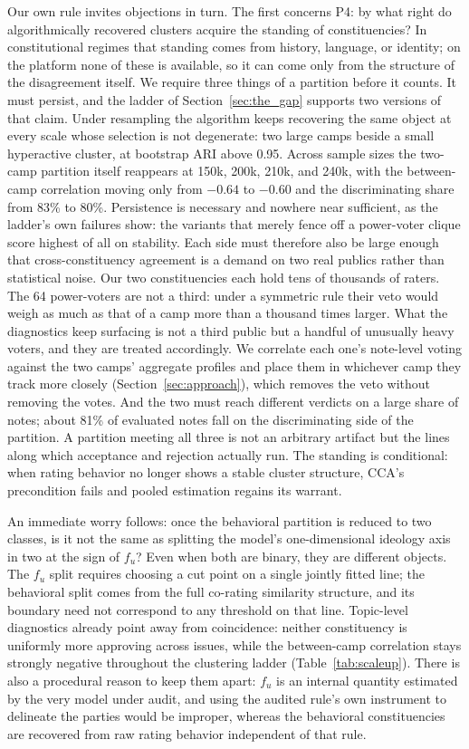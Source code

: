 \documentclass[10pt,twocolumn]{article}
\begin{document}
Our own rule invites objections in turn. The first concerns P4: by what right do
algorithmically recovered clusters acquire the standing of constituencies? In
constitutional regimes that standing comes from history, language, or identity; on
the platform none of these is available, so it can come only from the structure of
the disagreement itself. We require three things of a partition before it counts.
It must persist, and the ladder of Section~\ref{sec:the_gap} supports two versions
of that claim. Under resampling the algorithm keeps recovering the same object at
every scale whose selection is not degenerate: two large camps beside a small
hyperactive cluster, at bootstrap ARI above 0.95. Across sample sizes the two-camp
partition itself reappears at 150k, 200k, 210k, and 240k, with the between-camp
correlation moving only from $-0.64$ to $-0.60$ and the discriminating share from
83\% to 80\%. Persistence is necessary and nowhere near sufficient, as the
ladder's own failures show: the variants that merely fence off a power-voter clique
score highest of all on stability. Each side must therefore also be large enough
that cross-constituency agreement is a demand on two real publics rather than
statistical noise. Our two constituencies each hold tens of thousands of raters.
The 64 power-voters are not a third: under a symmetric rule their veto would weigh
as much as that of a camp more than a thousand times larger. What the diagnostics
keep surfacing is not a third public but a handful of unusually heavy voters, and
they are treated accordingly. We correlate each one's note-level voting against the
two camps' aggregate profiles and place them in whichever camp they track more
closely (Section~\ref{sec:approach}), which removes the veto without removing the
votes. And the two must reach different verdicts on a large share of notes; about
81\% of evaluated notes fall on the discriminating side of the partition. A
partition meeting all three is not an arbitrary artifact but the lines along which
acceptance and rejection actually run. The standing is conditional: when rating
behavior no longer shows a stable cluster structure, CCA's precondition fails and
pooled estimation regains its warrant.

An immediate worry follows: once the behavioral partition is reduced to two
classes, is it not the same as splitting the model's one-dimensional ideology axis
in two at the sign of $f_u$? Even when both are binary, they are different objects.
The $f_u$ split requires choosing a cut point on a single jointly fitted line; the
behavioral split comes from the full co-rating similarity structure, and its
boundary need not correspond to any threshold on that line. Topic-level
diagnostics already point away from coincidence: neither constituency is
uniformly more approving across issues, while the between-camp correlation stays
strongly negative throughout the clustering ladder (Table~\ref{tab:scaleup}).
There is also a procedural reason to keep them apart:
$f_u$ is an internal quantity estimated by the very model under audit, and using
the audited rule's own instrument to delineate the parties would be improper,
whereas the behavioral constituencies are recovered from raw rating behavior
independent of that rule.
\end{document}

